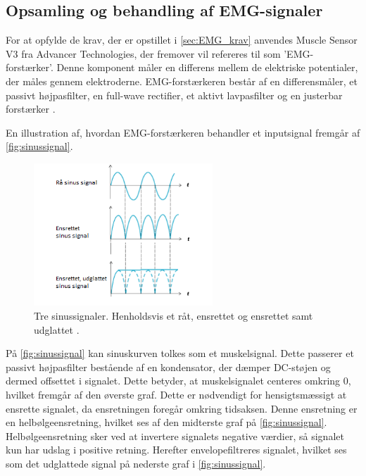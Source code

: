 \subsection{Opsamling og behandling af EMG-signaler} \label{sec:EMG_imp}
For at opfylde de krav, der er opstillet i \autoref{sec:EMG_krav} anvendes Muscle Sensor V3 fra Advancer Technologies, der fremover vil refereres til som 'EMG-forstærker'. Denne komponent måler en differens mellem de elektriske potentialer, der måles gennem elektroderne. EMG-forstærkeren består af en differensmåler, et passivt højpasfilter, en full-wave rectifier, et aktivt lavpasfilter og en justerbar forstærker \citep{advancertech2013}. 

En illustration af, hvordan EMG-forstærkeren behandler et inputsignal fremgår af \autoref{fig:sinussignal}.
\begin{figure}[H]
\centering
\includegraphics[width=0.6\textwidth]{figures/sinussignal.png}
\caption{Tre sinussignaler. Henholdsvis et råt, ensrettet og ensrettet samt udglattet \citep{advancertech2013}.}
\label{fig:sinussignal}
\end{figure}

\noindent
På \autoref{fig:sinussignal} kan sinuskurven tolkes som et muskelsignal. Dette passerer et passivt højpasfilter bestående af en kondensator, der dæmper DC-støjen og dermed offsettet i signalet. Dette betyder, at muskelsignalet centeres omkring 0, hvilket fremgår af den øverste graf. Dette er nødvendigt for hensigtsmæssigt at ensrette signalet, da ensretningen foregår omkring tidsaksen. Denne ensretning er en helbølgeensretning, hvilket ses af den midterste graf på \autoref{fig:sinussignal}. Helbølgeensretning sker ved at invertere signalets negative værdier, så signalet kun har udslag i positive retning. %
Herefter envelopefiltreres signalet, hvilket ses som det udglattede signal på nederste graf i \autoref{fig:sinussignal}. 

